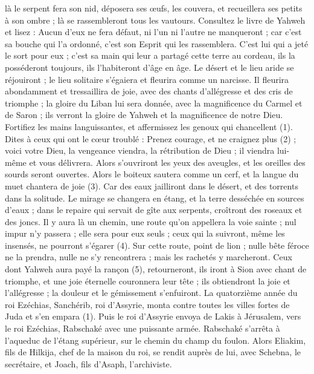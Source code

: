 \begin{multicols}{2}
là le serpent fera son nid, déposera ses œufs, les couvera, et recueillera ses petits à son ombre ; là se rassembleront tous les vautours.
Consultez le livre de Yahweh et lisez : Aucun d’eux ne fera défaut, ni l’un ni l’autre ne manqueront ; car c'est sa bouche qui l'a ordonné, c’est son Esprit qui les rassemblera.
C’est lui qui a jeté le sort pour eux ; c’est sa main qui leur a partagé cette terre au cordeau, ils la posséderont toujours, ils l’habiteront d'âge en âge.
\VerseOne{}Le désert et le lieu aride se réjouiront ; le lieu solitaire s'égaiera et fleurira comme un narcisse.
Il fleurira abondamment et tressaillira de joie, avec des chants d’allégresse et des cris de triomphe ; la gloire du Liban lui sera donnée, avec la magnificence du Carmel et de Saron ; ils verront la gloire de Yahweh et la magnificence de notre Dieu.
Fortifiez les mains languissantes, et affermissez les genoux qui chancellent (1).
Dites à ceux qui ont le cœur troublé : Prenez courage, et ne craignez plus (2) ; voici votre Dieu, la vengeance viendra, la rétribution de Dieu ; il viendra lui-même et vous délivrera.
Alors s’ouvriront les yeux des aveugles, et les oreilles des sourds seront ouvertes.
Alors le boiteux sautera comme un cerf, et la langue du muet chantera de joie (3). Car des eaux jailliront dans le désert, et des torrents dans la solitude.
Le mirage se changera en étang, et la terre desséchée en sources d’eaux ; dans le repaire qui servait de gîte aux serpents, croîtront des roseaux et des joncs.
Il y aura là un chemin, une route qu’on appellera la voie sainte ; nul impur n’y passera ; elle sera pour eux seuls ; ceux qui la suivront, même les insensés, ne pourront s’égarer (4).
Sur cette route, point de lion ; nulle bête féroce ne la prendra, nulle ne s’y rencontrera ; mais les rachetés y marcheront.
Ceux dont Yahweh aura payé la rançon (5), retourneront, ils iront à Sion avec chant de triomphe, et une joie éternelle couronnera leur tête ; ils obtiendront la joie et l'allégresse ; la douleur et le gémissement s'enfuiront.
\VerseOne{}La quatorzième année du roi Ezéchias, Sanchérib, roi d’Assyrie, monta contre toutes les villes fortes de Juda et s’en empara (1).
Puis le roi d’Assyrie envoya de Lakis à Jérusalem, vers le roi Ezéchias, Rabschaké avec une puissante armée. Rabschaké s’arrêta à l’aqueduc de l’étang supérieur, sur le chemin du champ du foulon.
Alors Eliakim, fils de Hilkija, chef de la maison du roi, se rendit auprès de lui, avec Schebna, le secrétaire, et Joach, fils d'Asaph, l’archiviste.

\end{multicols}
